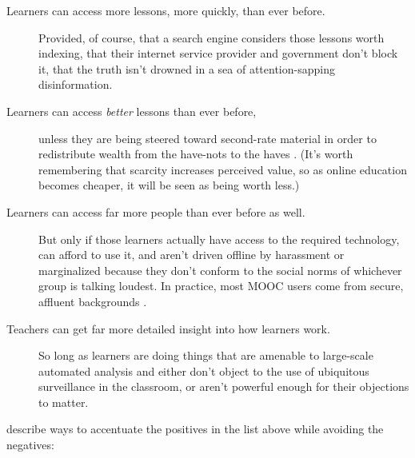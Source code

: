 \begin{description}

\item[Learners can access more lessons, more quickly, than ever
  before.]  Provided, of course, that a search engine considers those
  lessons worth indexing, that their internet service provider and
  government don't block it, that the truth isn't drowned in a sea of
  attention-sapping disinformation.

\item[Learners can access \emph{better} lessons than ever before,]
  unless they are being steered toward second-rate material in order
  to redistribute wealth from the have-nots to the haves
  \cite{McMi2017}.  (It's worth remembering that scarcity increases
  perceived value, so as online education becomes cheaper, it will be
  seen as being worth less.)

\item[Learners can access far more people than ever before as well.]
  But only if those learners actually have access to the required
  technology, can afford to use it, and aren't driven offline by
  harassment or marginalized because they don't conform to the social
  norms of whichever group is talking loudest.  In practice, most MOOC
  users come from secure, affluent backgrounds \cite{Hansen2015}.

\item[Teachers can get far more detailed insight into how learners
  work.]  So long as learners are doing things that are amenable to
  large-scale automated analysis and either don't object to the use of
  ubiquitous surveillance in the classroom, or aren't powerful enough
  for their objections to matter.

\end{description}

\noindent
\cite{Marg2015,Mill2016a,Nils2017} describe ways to accentuate the
positives in the list above while avoiding the negatives:


